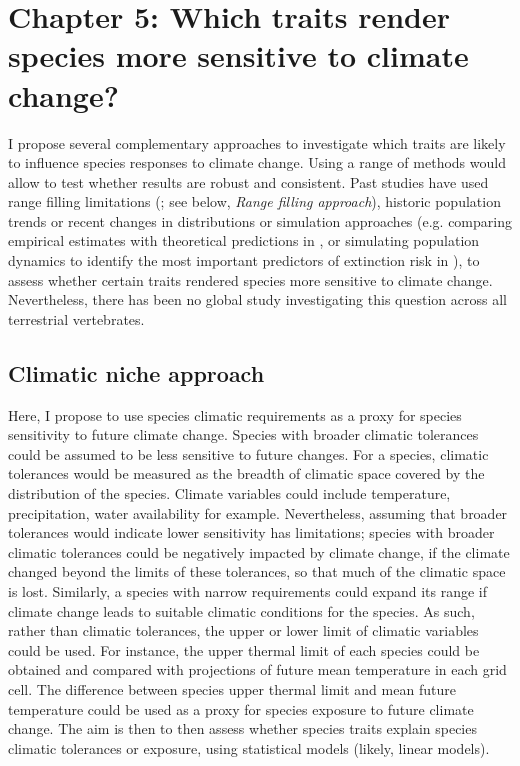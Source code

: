 \section{Chapter 5: Which traits render species more sensitive to climate change? }
I propose several complementary approaches to investigate which traits are likely to influence species responses to climate change. Using a range of methods would allow to test whether results are robust and consistent. Past studies have used range filling limitations (\cite{Estrada2018, Estrada2016}; see below, \textit{Range filling approach}), historic population trends or recent changes in distributions \citep{Angert2011, Pacifici2017, Mccain2014} or simulation approaches (e.g. comparing empirical estimates with theoretical predictions in \citet{Schloss2012}, or simulating population dynamics to identify the most important predictors of extinction risk in \citet{Pearson2014}), to assess whether certain traits rendered species more sensitive to climate change. Nevertheless, there has been no global study investigating this question across all terrestrial vertebrates.

\subsection{Climatic niche approach}
Here, I propose to use species climatic requirements as a proxy for species sensitivity to future climate change. Species with broader climatic tolerances could be assumed to be less sensitive to future changes.  For a species, climatic tolerances would be measured as the breadth of climatic space covered by the distribution of the species. Climate variables could include temperature, precipitation, water availability for example. Nevertheless, assuming that broader tolerances would indicate lower sensitivity has limitations; species with broader climatic tolerances could be negatively impacted by climate change, if the climate changed beyond the limits of these tolerances, so that much of the climatic space is lost. Similarly, a species with narrow requirements could expand its range if climate change leads to suitable climatic conditions for the species. As such, rather than climatic tolerances, the upper or lower limit of climatic variables could be used. 
For instance, the upper thermal limit of each species could be obtained and compared with projections of future mean temperature in each grid cell. The difference between species upper thermal limit and mean future temperature could be used as a proxy for species exposure to future climate change. 
The aim is then to then assess whether species traits explain species climatic tolerances or exposure, using statistical models (likely, linear models). 

